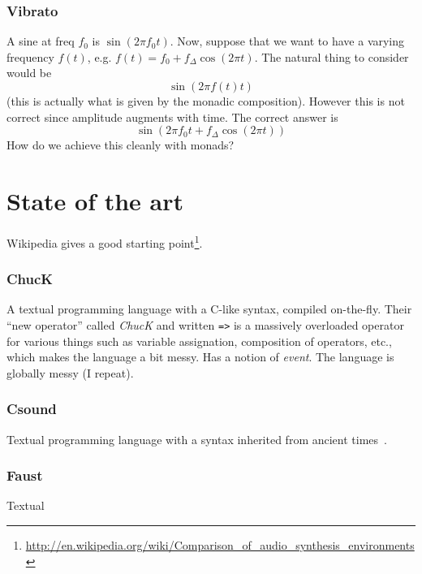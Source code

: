 \documentclass[a4paper,titlepage]{article}
\begin{document}
\subsubsection{Vibrato}
A sine at freq $f_0$ is $\sin(2\pi f_0 t)$. Now, suppose that we want to have a
varying frequency $f(t)$, e.g. $f(t)=f_0+f_\Delta\cos(2\pi t)$. The natural
thing to consider would be
\[
\sin(2\pi f(t) t)
\]
(this is actually what is given by the monadic composition). However this is
not correct since amplitude augments with time. The correct answer is
\[
\sin(2\pi f_0 t+f_\Delta\cos(2\pi t))
\]
How do we achieve this cleanly with monads?

\newpage
\section{State of the art}
Wikipedia gives a good starting
point\footnote{\url{http://en.wikipedia.org/wiki/Comparison_of_audio_synthesis_environments}}.


\subsubsection{ChucK}
A textual programming language with a C-like syntax, compiled
on-the-fly\cite{chuck}. Their ``new operator'' called \emph{ChucK} and written
\texttt{=>} is a massively overloaded operator for various things such as
variable assignation, composition of operators, etc., which makes the language a
bit messy. Has a notion of \emph{event}. The language is globally messy (I
repeat).

\subsubsection{Csound}
Textual programming language with a syntax inherited from ancient
times~\cite{csound}.

\subsubsection{Faust}
\cite{faust}
Textual
\end{document}
